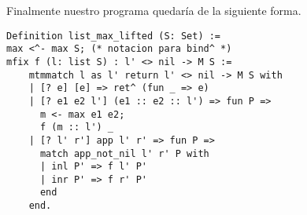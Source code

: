 Finalmente nuestro programa quedaría de la siguiente forma.

\begin{lstlisting}[float=h,frame=tb,caption={Lifteando \lstinline{ret} y \lstinline{bind}},label=lst:lift1]
Definition list_max_lifted (S: Set) :=
max <^- max S; (* notacion para bind^ *)
mfix f (l: list S) : l' <> nil -> M S :=
    mtmmatch l as l' return l' <> nil -> M S with
    | [? e] [e] => ret^ (fun _ => e)
    | [? e1 e2 l'] (e1 :: e2 :: l') => fun P =>
      m <- max e1 e2;
      f (m :: l') _
    | [? l' r'] app l' r' => fun P =>
      match app_not_nil l' r' P with
      | inl P' => f l' P'
      | inr P' => f r' P'
      end
    end.
\end{lstlisting}

\iffalse
Supongamos que queremos utilizamos el telescopio \lstinline{t := [T : Type ;> l : list T]$_t$} donde \lstinline{list T} es el tipo de las listas con elementos de tipo $T$.
Al momento de liftearlo, no es obvio cual debería ser el resultado, así que veamoslo.

\begin{lstlisting}
bind^ : \forall A B : \forall T : Type, list T -> Type,
         (\forall (T : Type) (l : list T), M (A T l)) ->
         (\forall (T : Type) (l : list T), A T l -> M (B T l)) ->
         (\forall (T : Type) (l : list T), M (B T l))
\end{lstlisting}

Lo más imporante es que si observamos la definición de esta función es sumamente simple.

\begin{lstlisting}
fun (A B : \forall T : Type, list T -> Type)
    (ma : \forall (T : Type) (l : list T), M (A T l))
    (f : \forall (T : Type) (l : list a), A T l -> M (B T l))
    (T : Type) (l : list T) =>
    bind (A T l) (B T l) (ma T l) (f T l)
\end{lstlisting}

Esta definición es efectivamente la que buscabamos y funciona perfectamente.
El otro aspecto que seguiremos observando es que Lift no genera información innecesaria en la función destino.
\fi